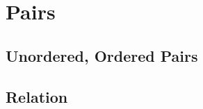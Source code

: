 \documentclass{book}
\begin{document}
% 			
% 			
% 		
% 		
% 		
	\chapter{Pairs}
		\section{Unordered, Ordered Pairs}
		
		\section{Relation}
		
\end{document}
